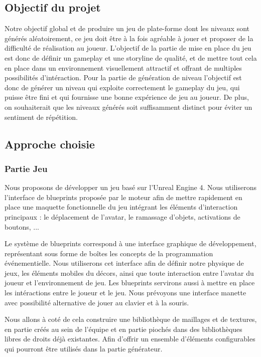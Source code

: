 \documentclass[12pt]{article}
\begin{document}
    \subsection{Objectif du projet}
        
        Notre objectif global et de produire un jeu de plate-forme dont les niveaux sont générés aléatoirement, ce jeu doit être à la fois agréable à jouer et proposer de la difficulté de réalisation au joueur. L'objectif de la partie de mise en place du jeu est donc de définir un gameplay et une storyline de qualité, et de mettre tout cela en place dans un environnement visuellement attractif et offrant de multiples possibilités d'intéraction. Pour la partie de génération de niveau l'objectif est donc de générer un niveau qui exploite correctement le gameplay du jeu, qui puisse être fini et qui fournisse une bonne expérience de jeu au joueur. De plus, on souhaiterait que les niveaux générés soit suffisamment distinct pour éviter un sentiment de répétition.
        
    \subsection{Approche choisie}
    
        \subsubsection{Partie Jeu}
            Nous proposons de développer un jeu basé sur l'Unreal Engine 4. Nous utiliserons l'interface de blueprints proposée par le moteur afin de mettre rapidement en place une maquette fonctionnelle du jeu intégrant les éléments d'interaction principaux : le déplacement de l'avatar, le ramassage d'objets, activations de boutons, ...
            
            Le système de blueprints correspond à une interface graphique de développement, représentant sous forme de boîtes les concepts de la programmation événementielle. Nous utiliserons cet interface afin de définir notre physique de jeux, les éléments mobiles du décors, ainsi que toute interaction entre l'avatar du joueur et l'environnement de jeu. Les blueprints servirons aussi à mettre en place les intéractions entre le joueur et le jeu. Nous prévoyons une interface manette avec possibilité alternative de jouer au clavier et à la souris.
            
            Nous allons à coté de cela construire une bibliothèque de maillages et de textures, en partie créés au sein de l'équipe et en partie piochés dans des bibliothèques libres de droits déjà existantes. Afin d'offrir un ensemble d'éléments configurables qui pourront être utilisés dans la partie générateur.
            
\end{document}
